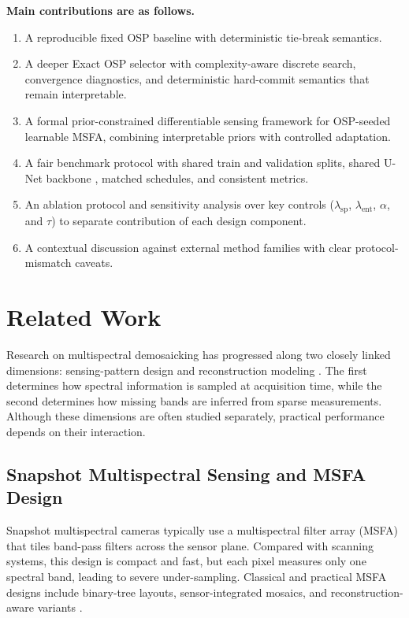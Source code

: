 \documentclass[journal]{IEEEtran}
\begin{document}
\textbf{Main contributions are as follows.}
\begin{enumerate}
\item A reproducible fixed OSP baseline with deterministic tie-break semantics.
\item A deeper Exact OSP selector with complexity-aware discrete search, convergence diagnostics, and deterministic hard-commit semantics that remain interpretable.
\item A formal prior-constrained differentiable sensing framework for OSP-seeded learnable MSFA, combining interpretable priors with controlled adaptation.
\item A fair benchmark protocol with shared train and validation splits, shared U-Net backbone \cite{ronneberger2015}, matched schedules, and consistent metrics.
\item An ablation protocol and sensitivity analysis over key controls ($\lambda_{\mathrm{sp}}$, $\lambda_{\mathrm{ent}}$, $\alpha$, and $\tau$) to separate contribution of each design component.
\item A contextual discussion against external method families with clear protocol-mismatch caveats.
\end{enumerate}

\section{Related Work}
Research on multispectral demosaicking has progressed along two closely linked dimensions: sensing-pattern design and reconstruction modeling \cite{miao2006,hirakawa2008,cheng2021}. The first determines how spectral information is sampled at acquisition time, while the second determines how missing bands are inferred from sparse measurements. Although these dimensions are often studied separately, practical performance depends on their interaction.

\subsection{Snapshot Multispectral Sensing and MSFA Design}
Snapshot multispectral cameras typically use a multispectral filter array (MSFA) that tiles band-pass filters across the sensor plane. Compared with scanning systems, this design is compact and fast, but each pixel measures only one spectral band, leading to severe under-sampling. Classical and practical MSFA designs include binary-tree layouts, sensor-integrated mosaics, and reconstruction-aware variants \cite{miao2006,geelen2014,tsagkatakis2019}.
\end{document}
